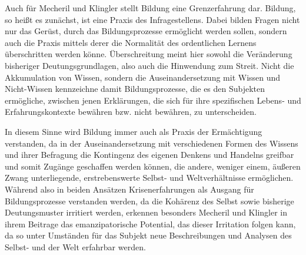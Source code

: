 Auch für Mecheril und Klingler stellt Bildung eine
Grenzerfahrung dar. Bildung, so heißt es zunächst, ist eine Praxis des
Infragestellens.  \footnotemark {} Dabei bilden Fragen nicht nur das Gerüst, durch das
Bildungsprozesse ermöglicht werden sollen, sondern auch die Praxis mittels
derer \glqq die Normalität des ordentlichen Lernens\grqq\footnotemark
{} überschritten werden könne.
Überschreitung meint hier sowohl die Veränderung bisheriger Deutungsgrundlagen,
also auch die Hinwendung zum Streit.\footnotemark {} Nicht die Akkumulation von Wissen,
sondern die Auseinandersetzung mit Wissen und Nicht-Wissen kennzeichne damit
Bildungsprozesse, die es den Subjekten ermögliche, zwischen jenen Erklärungen,
die sich für ihre spezifischen Lebens- und Erfahrungskontexte bewähren bzw.
nicht bewähren, zu unterscheiden. \footnotemark {} 

In diesem Sinne wird Bildung immer auch als
Praxis der Ermächtigung verstanden, da in der Auseinandersetzung mit
verschiedenen Formen des Wissens und ihrer Befragung die Kontingenz des eigenen
Denkens und Handelns greifbar und somit Zugänge geschaffen werden können, die
\glqq andere, weniger einem, äußeren Zwang unterliegende, erstrebenswerte Selbst-
und Weltverhältnisse\grqq\footnotemark {}  ermöglichen.
\\

Während also in beiden Ansätzen
Krisenerfahrungen als Ausgang für Bildungsprozesse verstanden werden, da die
Kohärenz des Selbst sowie bisherige Deutungsmuster irritiert werden, erkennen
besonders Mecheril und Klingler in ihrem Beitrage das emanzipatorische
Potential, das dieser Irritation folgen kann, da so unter Umständen für das
Subjekt neue Beschreibungen und Analysen des Selbst- und der Welt erfahrbar
werden. 

